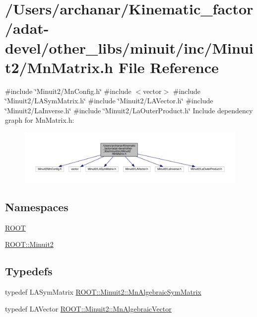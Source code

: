 \hypertarget{adat-devel_2other__libs_2minuit_2inc_2Minuit2_2MnMatrix_8h}{}\section{/\+Users/archanar/\+Kinematic\+\_\+factor/adat-\/devel/other\+\_\+libs/minuit/inc/\+Minuit2/\+Mn\+Matrix.h File Reference}
\label{adat-devel_2other__libs_2minuit_2inc_2Minuit2_2MnMatrix_8h}
{\ttfamily \#include \char`\"{}Minuit2/\+Mn\+Config.\+h\char`\"{}}\newline
{\ttfamily \#include $<$vector$>$}\newline
{\ttfamily \#include \char`\"{}Minuit2/\+L\+A\+Sym\+Matrix.\+h\char`\"{}}\newline
{\ttfamily \#include \char`\"{}Minuit2/\+L\+A\+Vector.\+h\char`\"{}}\newline
{\ttfamily \#include \char`\"{}Minuit2/\+La\+Inverse.\+h\char`\"{}}\newline
{\ttfamily \#include \char`\"{}Minuit2/\+La\+Outer\+Product.\+h\char`\"{}}\newline
Include dependency graph for Mn\+Matrix.\+h\+:
\nopagebreak
\begin{figure}[H]
\begin{center}
\leavevmode
\includegraphics[width=350pt]{d0/db3/adat-devel_2other__libs_2minuit_2inc_2Minuit2_2MnMatrix_8h__incl}
\end{center}
\end{figure}
\subsection*{Namespaces}
\begin{DoxyCompactItemize}
\item 
 \mbox{\hyperlink{namespaceROOT}{R\+O\+OT}}
\item 
 \mbox{\hyperlink{namespaceROOT_1_1Minuit2}{R\+O\+O\+T\+::\+Minuit2}}
\end{DoxyCompactItemize}
\subsection*{Typedefs}
\begin{DoxyCompactItemize}
\item 
typedef L\+A\+Sym\+Matrix \mbox{\hyperlink{namespaceROOT_1_1Minuit2_a9e74ad97f5537a2e80e52b04d98ecc6e}{R\+O\+O\+T\+::\+Minuit2\+::\+Mn\+Algebraic\+Sym\+Matrix}}
\item 
typedef L\+A\+Vector \mbox{\hyperlink{namespaceROOT_1_1Minuit2_a62ed97730a1ca8d3fbaec64a19aa11c9}{R\+O\+O\+T\+::\+Minuit2\+::\+Mn\+Algebraic\+Vector}}
\end{DoxyCompactItemize}
